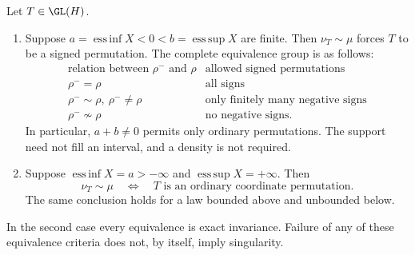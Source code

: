 \begin{theorem}
\label{thm:restricted-support-rigidity}
Let \(T\in\GL(H)\).
\begin{enumerate}
 \item Suppose \(a=\operatorname{ess\,inf}X<0<
 b=\operatorname{ess\,sup}X\) are finite.
 Then \(\nu_T\sim\mu\) forces \(T\) to be a signed permutation.
 The complete equivalence group is as follows:
 \[
 \begin{array}{c|l}
 \text{relation between }\rho^-\text{ and }\rho&\text{allowed signed permutations}\\ \hline
 \rho^-=\rho&\text{all signs}\\
 \rho^-\sim\rho,\ \rho^-\ne\rho&
                  \text{only finitely many negative signs}\\
 \rho^-\not\sim\rho&\text{no negative signs}.
 \end{array}
 \]
 In particular, \(a+b\ne0\) permits only ordinary permutations.
 The support need not fill an interval, and a density is not required.
 \item Suppose \(\operatorname{ess\,inf}X=a>-\infty\) and
 \(\operatorname{ess\,sup}X=+\infty\).
 Then
 \begin{equation}
  \nu_T\sim\mu
   \quad\Longleftrightarrow\quad
  T\text{ is an ordinary coordinate permutation}.
  \label{eq:restricted-halfline-classification}
 \end{equation}
 The same conclusion holds for a law bounded above and unbounded below.
\end{enumerate}
In the second case every equivalence is exact invariance.
Failure of any of these equivalence criteria does not, by itself,
imply singularity.
\end{theorem}
